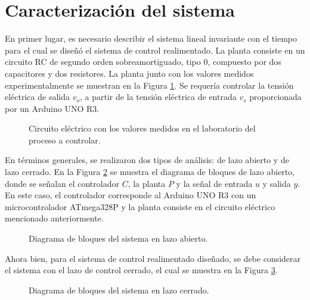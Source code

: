 
\section{Caracterización del sistema}

En primer lugar, es necesario describir el sistema lineal invariante con el tiempo para el cual se diseñó el sistema de control realimentado.
La planta consiste en un circuito RC de segundo orden sobreamortiguado, tipo 0, compuesto por dos capacitores y dos resistores.
La planta junto con los valores medidos experimentalmente se muestran en la Figura \ref{fig:circuito_planta}.
Se requería controlar la tensión eléctrica de salida $v_o$, a partir de la tensión eléctrica de entrada $v_s$ proporcionada por un Arduino UNO R3.

\begin{figure}[htbp]
    \centering
    \caption{Circuito eléctrico con los valores medidos en el laboratorio del proceso a controlar.}
    \label{fig:circuito_planta}
\end{figure}

En términos generales, se realizaron dos tipos de análisis: de lazo abierto y de lazo cerrado.
En la Figura \ref{fig:diagrama-bloques-lazo-abierto} se muestra el diagrama de bloques de lazo abierto, donde se señalan el controlador $C$, la planta $P$ y la señal de entrada $u$ y salida $y$.
En este caso, el controlador corresponde al Arduino UNO R3 con un microcontrolador ATmega328P y la planta consiste en el circuito eléctrico mencionado anteriormente.

\begin{figure}[htbp]
    \centering
    \caption{Diagrama de bloques del sistema en lazo abierto.}
    \label{fig:diagrama-bloques-lazo-abierto}
\end{figure}

Ahora bien, para el sistema de control realimentado diseñado, se debe considerar el sistema con el lazo de control cerrado, el cual se muestra en la Figura \ref{fig:diagrama-bloques-lazo-cerrado}.

\begin{figure}[htbp]
    \centering
    \caption{Diagrama de bloques del sistema en lazo cerrado.}
    \label{fig:diagrama-bloques-lazo-cerrado}
\end{figure}


